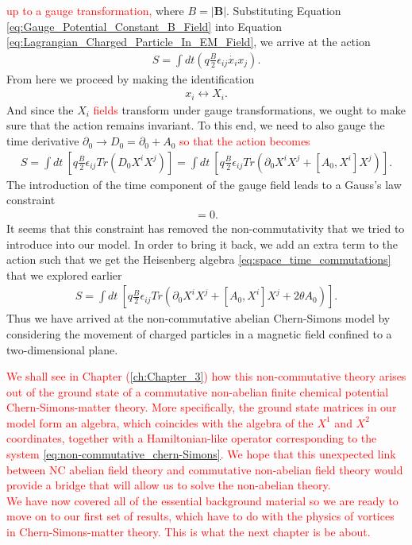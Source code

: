     \textcolor{red}{up to a gauge transformation,} where $B= |\bm{B}|$.
    Substituting Equation \eqref{eq:Gauge_Potential_Constant_B_Field}  into Equation \eqref{eq:Lagrangian_Charged_Particle_In_EM_Field}, we arrive at the action
    \begin{align}
        S = \int dt \left( q \frac{B}{2}\epsilon_{i j} \dot{x_i} x_j \right).
    \end{align}
    From here we proceed by making the identification
    \begin{align}
        x_i \leftrightarrow X_i.
    \end{align}
    And since the $X_i$ \textcolor{red}{fields} transform under gauge transformations, we ought to make sure that the action remains invariant. To this end, we need to also gauge the time derivative $\partial_0 \rightarrow D_0 = \partial_0 +A_0$ \textcolor{red}{ so that the action becomes}
    \begin{align}
        S = \int dt \ \left[ q \frac{B}{2} \epsilon_{ij} Tr \left(D_0 X^i X^j \right) \right] = \int dt \ \left[ q \frac{B}{2} \epsilon_{ij} Tr \left(\partial_0 X^i X^j + [A_0, X^i] X^j \right) \right].
    \end{align}
    The introduction of the time component of the gauge field leads to a Gauss's law constraint
    \begin{align}
        [X^1, X^2] =0.
    \end{align}
    It seems that this constraint has removed the non-commutativity that we tried to introduce into our model. In order to bring it back, we add an extra term to the action such that we get the Heisenberg algebra \eqref{eq:space_time_commutations} that we explored earlier
    \begin{align}
        S =\int dt \ \left[ q \frac{B}{2} \epsilon_{ij} Tr \left(\partial_0 X^i X^j + [A_0, X^i] X^j + 2 \theta A_0 \right) \right]. \label{eq:non-commutative_chern-Simons}
    \end{align}
    Thus we have arrived at the non-commutative abelian Chern-Simons model by considering the movement of charged particles in a magnetic field confined to a two-dimensional plane.


\textcolor{red}{We shall see in Chapter (\ref{ch:Chapter_3}) how this non-commutative theory arises out of the ground state of a commutative non-abelian finite chemical potential Chern-Simons-matter theory. More specifically, the ground state matrices in our model form an algebra, which coincides with the algebra of the $X^1$ and $X^2$ coordinates, together with a Hamiltonian-like operator corresponding to the system \eqref{eq:non-commutative_chern-Simons}. We hope that this unexpected link between NC abelian field theory and commutative non-abelian field theory would provide a bridge that will allow us to solve the non-abelian theory.}\\
 \indent \textcolor{red}{We have now covered all of the essential background material so we are ready to move on to our first set of results, which have to do with the physics of vortices in Chern-Simons-matter theory. This is what the next chapter is be about. }

    

